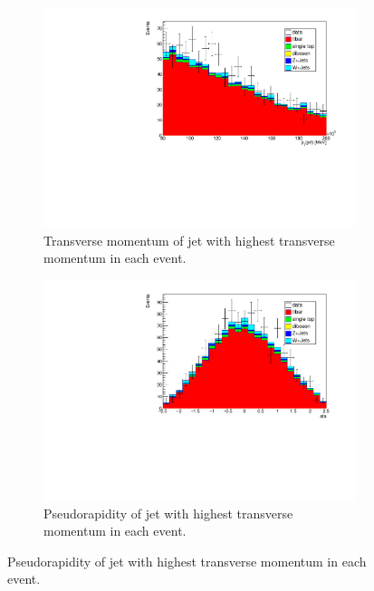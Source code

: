\begin{figure}[H]
  \begin{subfigure}{0.45\textwidth}%
    \centering%
    \includegraphics[width=\textwidth]{plots/comparism/jet_pt_max.pdf}%
    \caption{Transverse momentum of jet with highest transverse momentum in each event.}%
    \label{fig:6e}%
  \end{subfigure}%
  \hfill
  \begin{subfigure}{0.45\textwidth}%
    \centering%
    \includegraphics[width=\textwidth]{plots/comparism/jet_eta_max.pdf}%
    \caption{Pseudorapidity of jet with highest transverse momentum in each event.}%
    \label{fig:6f}%
  \end{subfigure}%


\end{figure}
